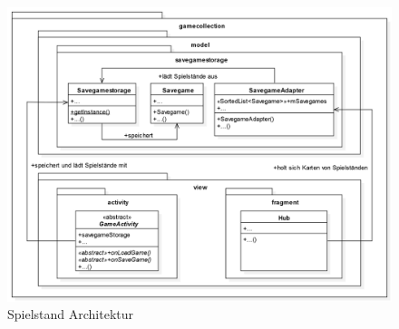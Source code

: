 \begin{figure}[h]
	\centering
	\includegraphics[width=1.0\textwidth]{resources/savegamestorage/Savegamestorage}
	\caption{Spielstand Architektur}
\end{figure}